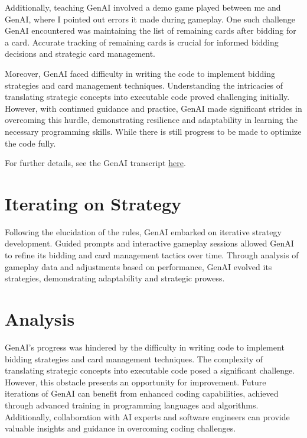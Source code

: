 \documentclass{article}
\begin{document}
\vspace{0.5cm} %

Additionally, teaching GenAI involved a demo game played between me and GenAI, where I pointed out errors it made during gameplay. One such challenge GenAI encountered was maintaining the list of remaining cards after bidding for a card. Accurate tracking of remaining cards is crucial for informed bidding decisions and strategic card management.

\vspace{0.5cm} %

Moreover, GenAI faced difficulty in writing the code to implement bidding strategies and card management techniques. Understanding the intricacies of translating strategic concepts into executable code proved challenging initially. However, with continued guidance and practice, GenAI made significant strides in overcoming this hurdle, demonstrating resilience and adaptability in learning the necessary programming skills. While there is still progress to be made to optimize the code fully.

\vspace{0.5cm} %

For further details, see the GenAI transcript \href{https://docs.google.com/document/d/1eL58ZQdyULYBA-CMjfxMR6xRTC0HlldTMRjW1cI0_RM/edit?usp=sharing}{here}.


\section{Iterating on Strategy}
Following the elucidation of the rules, GenAI embarked on iterative strategy development. Guided prompts and interactive gameplay sessions allowed GenAI to refine its bidding and card management tactics over time. Through analysis of gameplay data and adjustments based on performance, GenAI evolved its strategies, demonstrating adaptability and strategic prowess.

\section{Analysis}
GenAI's progress was hindered by the difficulty in writing code to implement bidding strategies and card management techniques. The complexity of translating strategic concepts into executable code posed a significant challenge. However, this obstacle presents an opportunity for improvement. Future iterations of GenAI can benefit from enhanced coding capabilities, achieved through advanced training in programming languages and algorithms. Additionally, collaboration with AI experts and software engineers can provide valuable insights and guidance in overcoming coding challenges.
\end{document}
